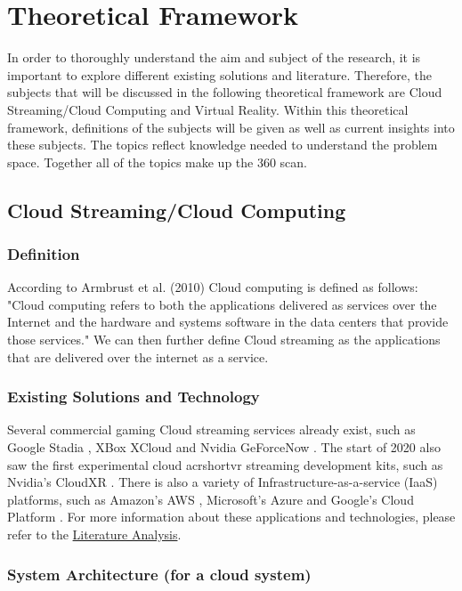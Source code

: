 \section{Theoretical Framework}

In order to thoroughly understand the aim and subject of the research, it is important to explore different existing solutions and literature. Therefore, the subjects that will be discussed in the  following theoretical framework are Cloud Streaming/Cloud Computing and Virtual Reality. Within this theoretical framework, definitions of the subjects will be given as well as current insights into these subjects. The topics reflect knowledge needed to understand the problem space. Together all of the topics make up the 360 scan.

\subsection{Cloud Streaming/Cloud Computing}

\subsubsection{Definition}
According to Armbrust et al. (2010) Cloud computing is defined as follows: 
"Cloud computing refers to both the applications delivered as services over the Internet and the hardware and systems software in the data centers that provide those services." \parencite[]{aviewoncc}
We can then further define Cloud streaming as the applications that are delivered over the internet as a service.

\subsubsection{Existing Solutions and Technology}
Several commercial gaming Cloud streaming services already exist, such as Google Stadia \parencite{stadia}, XBox XCloud \parencite{xcloud} and Nvidia GeForceNow \parencite{geforcenow}. The start of 2020 also saw the first experimental cloud acrshort{vr} streaming development kits, such as Nvidia's CloudXR \parencite{cloudxr}. There is also a variety of Infrastructure\hyp{}as\hyp{}a\hyp{}service (IaaS) platforms, such as Amazon's AWS \parencite{aws}, Microsoft's Azure \parencite{azure} and Google's Cloud Platform \parencite{gcp}. For more information about these applications and technologies, please refer to the \hyperref[sec:lit]{Literature Analysis}.

\subsubsection{System Architecture (for a cloud system)}

